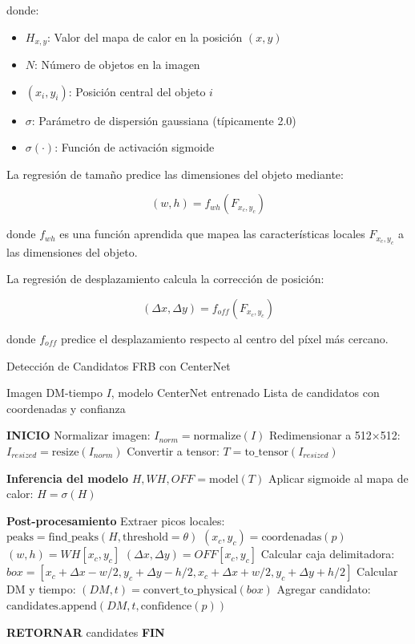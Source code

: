 donde:
\begin{itemize}
    \item $H_{x,y}$: Valor del mapa de calor en la posición $(x,y)$
    \item $N$: Número de objetos en la imagen
    \item $(x_i, y_i)$: Posición central del objeto $i$
    \item $\sigma$: Parámetro de dispersión gaussiana (típicamente 2.0)
    \item $\sigma(\cdot)$: Función de activación sigmoide
\end{itemize}

La regresión de tamaño predice las dimensiones del objeto mediante:

\[
(w, h) = f_{wh}(F_{x_c, y_c})
\]

donde $f_{wh}$ es una función aprendida que mapea las características locales $F_{x_c, y_c}$ a las dimensiones del objeto.

La regresión de desplazamiento calcula la corrección de posición:

\[
(\Delta x, \Delta y) = f_{off}(F_{x_c, y_c})
\]

donde $f_{off}$ predice el desplazamiento respecto al centro del píxel más cercano.

\begin{algorithm}[H]
\caption{Detección de Candidatos FRB con CenterNet}
\label{alg:centernet-detection}
\begin{algorithmic}[1]
\Require Imagen DM-tiempo $I$, modelo CenterNet entrenado
\Ensure Lista de candidatos con coordenadas y confianza

\State \textbf{INICIO}
\State Normalizar imagen: $I_{norm} = \text{normalize}(I)$
\State Redimensionar a 512×512: $I_{resized} = \text{resize}(I_{norm})$
\State Convertir a tensor: $T = \text{to\_tensor}(I_{resized})$

\State \textbf{Inferencia del modelo}
\State $H, WH, OFF = \text{model}(T)$ 
\State Aplicar sigmoide al mapa de calor: $H = \sigma(H)$

\State \textbf{Post-procesamiento}
\State Extraer picos locales: $\text{peaks} = \text{find\_peaks}(H, \text{threshold}=\theta)$
    \State $(x_c, y_c) = \text{coordenadas}(p)$
    \State $(w, h) = WH[x_c, y_c]$ 
    \State $(\Delta x, \Delta y) = OFF[x_c, y_c]$ 
    \State Calcular caja delimitadora: $box = [x_c + \Delta x - w/2, y_c + \Delta y - h/2, x_c + \Delta x + w/2, y_c + \Delta y + h/2]$
    \State Calcular DM y tiempo: $(DM, t) = \text{convert\_to\_physical}(box)$
    \State Agregar candidato: $\text{candidates.append}(DM, t, \text{confidence}(p))$
        \EndFor

\State \textbf{RETORNAR} candidates
\State \textbf{FIN}
\end{algorithmic}
\end{algorithm}
